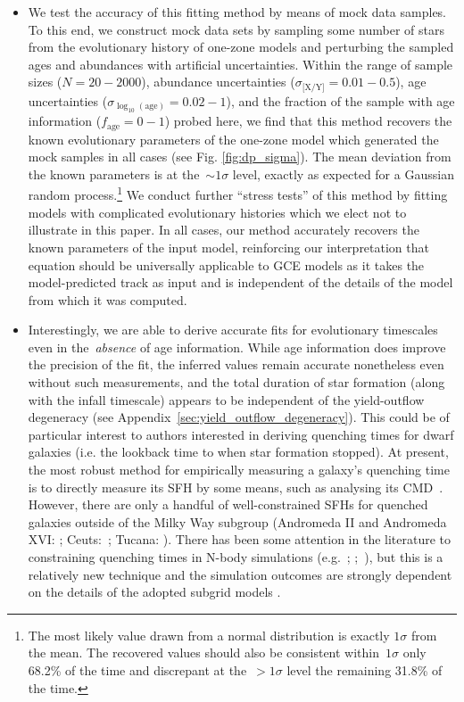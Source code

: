 \documentclass[ms.tex]{subfiles}
\begin{document}
\begin{itemize}
	\item We test the accuracy of this fitting method by means of mock data
	samples.
	To this end, we construct mock data sets by sampling some number of stars
	from the evolutionary history of one-zone models and perturbing the sampled
	ages and abundances with artificial uncertainties.
	Within the range of sample sizes ($N = 20 - 2000$), abundance uncertainties
	($\sigma_\text{[X/Y]} = 0.01 - 0.5$), age uncertainties
	($\sigma_{\log_{10}(\text{age})} = 0.02 - 1$), and the fraction of the
	sample with age information ($f_\text{age} = 0 - 1$) probed here, we find
	that this method recovers the known evolutionary parameters of the one-zone
	model which generated the mock samples in all cases (see Fig.
	\ref{fig:dp_sigma}).
	The mean deviation from the known parameters is at the~$\sim1\sigma$ level,
	exactly as expected for a Gaussian random process.\footnote{
		The most likely value drawn from a normal distribution is exactly
		$1\sigma$ from the mean.
		The recovered values should also be consistent within~$1\sigma$ only
		68.2\% of the time and discrepant at the~$>1\sigma$ level the remaining
		31.8\% of the time.
	}
	We conduct further ``stress tests'' of this method by fitting models with
	complicated evolutionary histories which we elect not to illustrate in this
	paper.
	In all cases, our method accurately recovers the known parameters of the
	input model, reinforcing our interpretation that equation
	 should be universally applicable to GCE models as it
	takes the model-predicted track as input and is independent of the details
	of the model from which it was computed.

	\item Interestingly, we are able to derive accurate fits for evolutionary
	timescales even in the~\textit{absence} of age information.
	While age information does improve the precision of the fit, the inferred
	values remain accurate nonetheless even without such measurements, and
	the total duration of star formation (along with the infall timescale)
	appears to be independent of the yield-outflow degeneracy
	(see Appendix~\ref{sec:yield_outflow_degeneracy}).
	This could be of particular interest to authors interested in deriving
	quenching times for dwarf galaxies (i.e. the lookback time to when star
	formation stopped).
	At present, the most robust method for empirically measuring a galaxy's
	quenching time is to directly measure its SFH by some means, such as
	analysing its CMD~\citep[e.g.][]{Sohn2013, Weisz2015}.
	However, there are only a handful of well-constrained SFHs for quenched
	galaxies outside of the Milky Way subgroup (Andromeda II and Andromeda XVI:
	\citealp{Weisz2014a}; Ceuts:~\citealp{Monelli2010a}; Tucana:
	\citealp{Monelli2010b}).
	There has been some attention in the literature to constraining quenching
	times in N-body simulations (e.g.~\citealp{Phillips2014, Phillips2015};
	\citealp*{Rocha2012};~\citealp{Slater2013, Slater2014, Wheeler2014}), but
	this is a relatively new technique and the simulation outcomes are strongly
	dependent on the details of the adopted subgrid models
	\citep[see discussion in, e.g.,][]{Li2020}.


\end{itemize}
\end{document}
